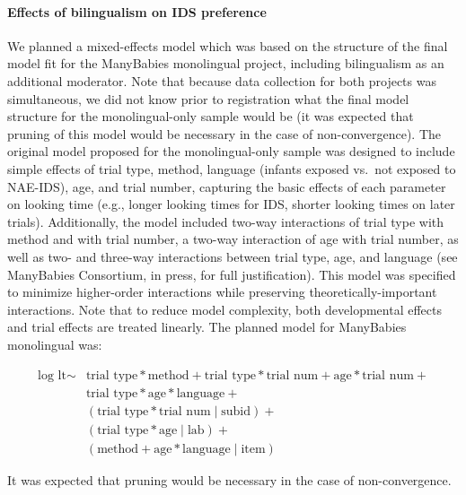 \documentclass[english,,man,floatsintext]{apa6}
\begin{document}
\hypertarget{effects-of-bilingualism-on-ids-preference}{%
\paragraph{Effects of bilingualism on IDS preference}\label{effects-of-bilingualism-on-ids-preference}}

We planned a mixed-effects model which was based on the structure of the final model fit for the ManyBabies monolingual project, including bilingualism as an additional moderator. Note that because data collection for both projects was simultaneous, we did not know prior to registration what the final model structure for the monolingual-only sample would be (it was expected that pruning of this model would be necessary in the case of non-convergence). The original model proposed for the monolingual-only sample was designed to include simple effects of trial type, method, language (infants exposed vs.~not exposed to NAE-IDS), age, and trial number, capturing the basic effects of each parameter on looking time (e.g., longer looking times for IDS, shorter looking times on later trials). Additionally, the model included two-way interactions of trial type with method and with trial number, a two-way interaction of age with trial number, as well as two- and three-way interactions between trial type, age, and language (see ManyBabies Consortium, in press, for full justification). This model was specified to minimize higher-order interactions while preserving theoretically-important interactions. Note that to reduce model complexity, both developmental effects and trial effects are treated linearly. The planned model for ManyBabies monolingual was:

\begin{equation}
\begin{split}
\text{log lt} \sim & \text{trial type} * \text{method} + \text{trial type} * \text{trial num} + \text{age} * \text{trial num} + \\
& \text{trial type} * \text{age} * \text{language} + \\
& (\text{trial type} * \text{trial num} \mid \text{subid}) + \\
& (\text{trial type} * \text{age} \mid \text{lab}) + \\
& (\text{method} + \text{age} * \text{language} \mid \text{item})
\end{split}
\end{equation}

It was expected that pruning would be necessary in the case of non-convergence.
\end{document}
